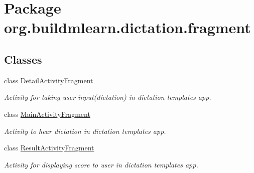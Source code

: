 \hypertarget{namespaceorg_1_1buildmlearn_1_1dictation_1_1fragment}{}\section{Package org.\+buildmlearn.\+dictation.\+fragment}
\label{namespaceorg_1_1buildmlearn_1_1dictation_1_1fragment}
\subsection*{Classes}
\begin{DoxyCompactItemize}
\item 
class \hyperlink{classorg_1_1buildmlearn_1_1dictation_1_1fragment_1_1DetailActivityFragment}{Detail\+Activity\+Fragment}
\begin{DoxyCompactList}\small\item\em Activity for taking user input(dictation) in dictation template\textquotesingle{}s app. \end{DoxyCompactList}\item 
class \hyperlink{classorg_1_1buildmlearn_1_1dictation_1_1fragment_1_1MainActivityFragment}{Main\+Activity\+Fragment}
\begin{DoxyCompactList}\small\item\em Activity to hear dictation in dictation template\textquotesingle{}s app. \end{DoxyCompactList}\item 
class \hyperlink{classorg_1_1buildmlearn_1_1dictation_1_1fragment_1_1ResultActivityFragment}{Result\+Activity\+Fragment}
\begin{DoxyCompactList}\small\item\em Activity for displaying score to user in dictation template\textquotesingle{}s app. \end{DoxyCompactList}\end{DoxyCompactItemize}
